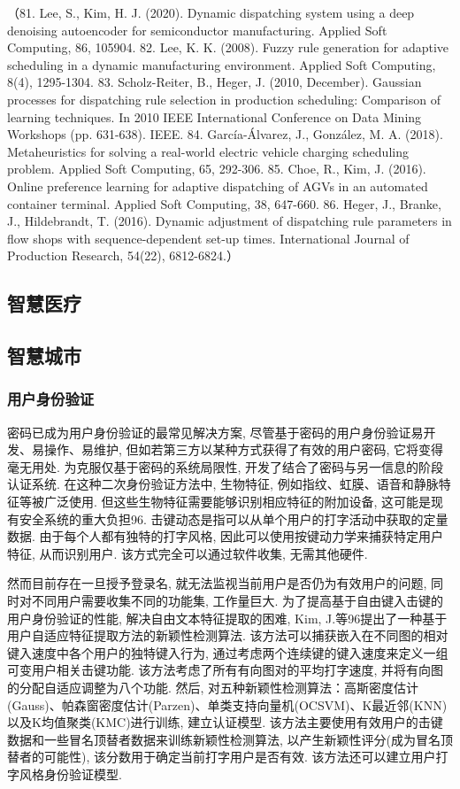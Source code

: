 \documentclass{Style/aas}
\begin{document}
\begin{multicols}{2}
（81.	Lee, S., Kim, H. J. (2020). Dynamic dispatching system using a deep denoising autoencoder for semiconductor manufacturing. Applied Soft Computing, 86, 105904.
82.	Lee, K. K. (2008). Fuzzy rule generation for adaptive scheduling in a dynamic manufacturing environment. Applied Soft Computing, 8(4), 1295-1304.
83.	Scholz-Reiter, B., Heger, J. (2010, December). Gaussian processes for dispatching rule selection in production scheduling: Comparison of learning techniques. In 2010 IEEE International Conference on Data Mining Workshops (pp. 631-638). IEEE.
84.	García-Álvarez, J., González, M. A. (2018). Metaheuristics for solving a real-world electric vehicle charging scheduling problem. Applied Soft Computing, 65, 292-306.
85.	Choe, R., Kim, J. (2016). Online preference learning for adaptive dispatching of AGVs in an automated container terminal. Applied Soft Computing, 38, 647-660.
86.	Heger, J., Branke, J., Hildebrandt, T. (2016). Dynamic adjustment of dispatching rule parameters in flow shops with sequence-dependent set-up times. International Journal of Production Research, 54(22), 6812-6824.） 


\subsection{智慧医疗}

\subsection{智慧城市}
\subsubsection{用户身份验证}
密码已成为用户身份验证的最常见解决方案, 尽管基于密码的用户身份验证易开发、易操作、易维护, 但如若第三方以某种方式获得了有效的用户密码, 它将变得毫无用处. 为克服仅基于密码的系统局限性, 开发了结合了密码与另一信息的阶段认证系统. 在这种二次身份验证方法中, 生物特征, 例如指纹、虹膜、语音和静脉特征等被广泛使用. 但这些生物特征需要能够识别相应特征的附加设备, 这可能是现有安全系统的重大负担96. 击键动态是指可以从单个用户的打字活动中获取的定量数据. 由于每个人都有独特的打字风格, 因此可以使用按键动力学来捕获特定用户特征, 从而识别用户. 该方式完全可以通过软件收集, 无需其他硬件.

然而目前存在一旦授予登录名, 就无法监视当前用户是否仍为有效用户的问题, 同时对不同用户需要收集不同的功能集, 工作量巨大. 为了提高基于自由键入击键的用户身份验证的性能, 解决自由文本特征提取的困难, Kim, J.等96提出了一种基于用户自适应特征提取方法的新颖性检测算法. 该方法可以捕获嵌入在不同图的相对键入速度中各个用户的独特键入行为, 通过考虑两个连续键的键入速度来定义一组可变用户相关击键功能. 该方法考虑了所有有向图对的平均打字速度, 并将有向图的分配自适应调整为八个功能. 然后, 对五种新颖性检测算法：高斯密度估计(Gauss)、帕森窗密度估计(Parzen)、单类支持向量机(OCSVM)、K最近邻(KNN)以及K均值聚类(KMC)进行训练, 建立认证模型. 该方法主要使用有效用户的击键数据和一些冒名顶替者数据来训练新颖性检测算法, 以产生新颖性评分(成为冒名顶替者的可能性), 该分数用于确定当前打字用户是否有效. 该方法还可以建立用户打字风格身份验证模型. 


\end{multicols}
\end{document}
